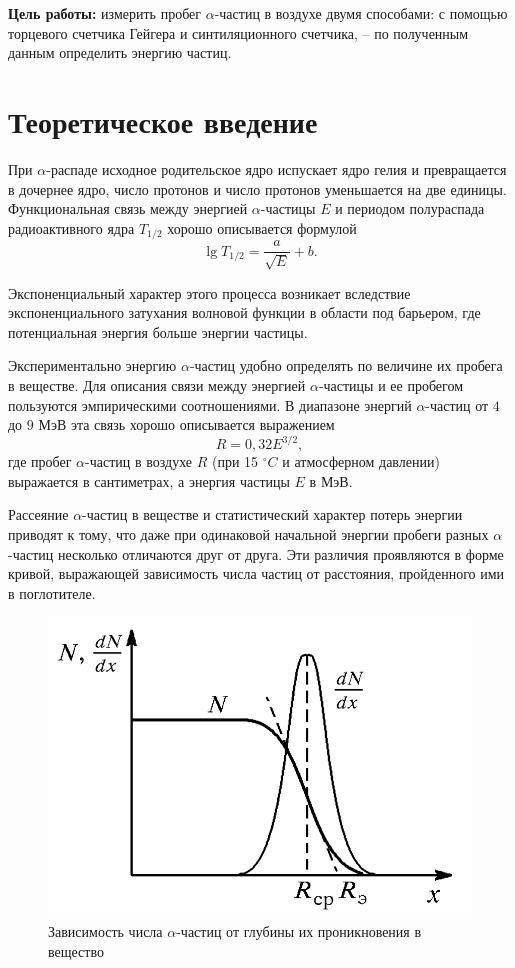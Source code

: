 \textbf{Цель работы:} измерить пробег $\alpha$-частиц в воздухе двумя способами: с помощью торцевого счетчика Гейгера и синтиляционного счетчика, -- по полученным данным определить энергию частиц.
                    
\section{Теоретическое введение}

    При $\alpha$-распаде исходное родительское ядро испускает ядро гелия и превращается в дочернее ядро, число протонов и число протонов уменьшается на две единицы. Функциональная связь между энергией $\alpha$-частицы $E$ и периодом полураспада радиоактивного ядра $T_{1/2}$ хорошо описывается формулой
	\begin{equation*}
		 \lg T_{1/2} = \frac{a}{\sqrt{E}} + b.
	\end{equation*}

	Экспоненциальный характер этого процесса возникает вследствие экспоненциального затухания волновой функции в области под барьером, где потенциальная энергия больше энергии частицы.


    Экспериментально энергию $\alpha$-частиц удобно определять по величине их пробега в веществе.
	Для описания связи между энергией $\alpha$-частицы и ее пробегом пользуются эмпирическими соотношениями. В диапазоне энергий $\alpha$-частиц от $4$ до $9$ МэВ эта связь хорошо описывается выражением
	\begin{equation}
		R = 0,32 E^{3/2},
	\end{equation}
    где пробег $\alpha$-частиц в воздухе $R$ (при 15 $^\circ C$ и атмосферном давлении) выражается в сантиметрах, а энергия частицы $E$ в МэВ.

    Рассеяние $\alpha$-частиц в веществе и статистический характер потерь энергии приводят к тому, что даже при одинаковой начальной энергии пробеги разных $\alpha$-частиц несколько отличаются друг от друга. Эти различия проявляются в форме кривой, выражающей зависимость числа частиц от расстояния, пройденного ими в поглотителе.

    \begin{figure}[h!]
        \centering
        \includegraphics[width = 8.5 cm]{images/dn_dx}
        \caption{Зависимость числа $\alpha$-частиц от глубины их проникновения в вещество}
        \label{}
    \end{figure}

